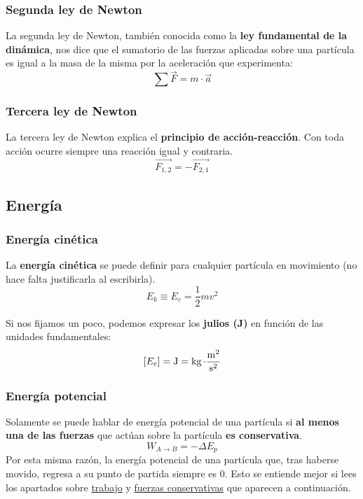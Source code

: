 \documentclass[a4paper]{book}
\begin{document}
\subsubsection{Segunda ley de Newton}
La segunda ley de Newton, también conocida como la \textbf{ley fundamental de la dinámica}, nos dice que el sumatorio de las fuerzas aplicadas sobre una partícula es igual a la masa de la misma por la aceleración que experimenta:
\begin{equation} \label{eq:segunda_ley_Newton}
	\boxed{\sum{\vec{F}} = m\cdot \vec{a}}
\end{equation}

\subsubsection{Tercera ley de Newton}
La tercera ley de Newton explica el \textbf{principio de acción-reacción}. Con toda acción ocurre siempre una reacción igual y contraria.
\begin{equation} \label{eq:tercera_ley_Newton}
	\boxed{\vec{F_{1,2}} = -\vec{F_{2,1}}}
\end{equation}
\subsection{Energía}
\subsubsection{Energía cinética}
La \textbf{energía cinética} se puede definir para cualquier partícula en movimiento (no hace falta justificarla al escribirla).\[E_k \equiv \boxed{E_c = \frac{1}{2}mv^2}\]

Si nos fijamos un poco, podemos expresar los \textbf{julios (J)} en función de las unidades fundamentales: \[[E_c] = \operatorname{J} = \operatorname{kg} \cdot \frac{\operatorname{m} ^2}{\operatorname{s} ^2}\]

\subsubsection{Energía potencial}
Solamente se puede hablar de energía potencial de una partícula si \textbf{al menos una de las fuerzas} que actúan sobre la partícula \textbf{es conservativa}.
\[\boxed{W_{A\to B} = -\Delta E_p}\]
Por esta misma razón, la energía potencial de una partícula que, tras haberse movido, regresa a su punto de partida siempre es 0.
Esto se entiende mejor si lees los apartados sobre \hyperref[subsec:trabajo]{trabajo} y \hyperref[subsec:fuerza_conservativa]{fuerzas conservativas} que aparecen a continuación.
\end{document}
